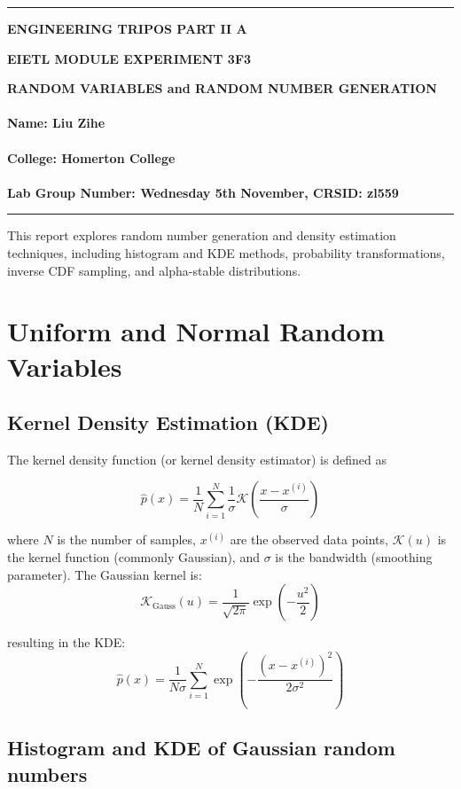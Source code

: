 \documentclass[12pt]{article}
\begin{document}
\noindent
\rule{15.7cm}{0.5mm}

\begin{center}
    {\bf ENGINEERING TRIPOS PART II A}
\end{center}
\vspace{0.5cm} {\bf EIETL \hfill MODULE EXPERIMENT 3F3}
\vspace{0.5cm}
\begin{center}
    {\bf RANDOM VARIABLES and RANDOM NUMBER GENERATION
        \\\hfill \\Name: Liu Zihe \\\hfill\\
        College: Homerton College\\\hfill
        \\
        Lab Group Number: Wednesday 5th November, CRSID: zl559
    }
\end{center}
\rule{15.7cm}{0.5mm}

This report explores random number generation and density estimation techniques, including histogram and KDE methods, probability transformations, inverse CDF sampling, and alpha-stable distributions.

\section{Uniform and Normal Random Variables}

\subsection{Kernel Density Estimation (KDE)}

The kernel density function (or kernel density estimator) is defined as

$$\hat{p}(x) = \frac{1}{N}\sum_{i=1}^{N} \frac{1}{\sigma}\mathcal{K}\left(\frac{x - x^{(i)}}{\sigma}\right)$$

where $N$ is the number of samples, $x^{(i)}$ are the observed data points, $\mathcal{K}(u)$ is the kernel function (commonly Gaussian), and $\sigma$ is the bandwidth (smoothing parameter). The Gaussian kernel is:
$$\mathcal{K}_{\text{Gauss}}(u) = \frac{1}{\sqrt{2\pi}}\exp\left(-\frac{u^2}{2}\right)$$

resulting in the KDE:
$$\hat{p}(x) = \frac{1}{N\sigma}\sum_{i=1}^{N}\exp\left(-\frac{(x - x^{(i)})^2}{2\sigma^2}\right)$$

\subsection{Histogram and KDE of Gaussian random numbers}
\end{document}
